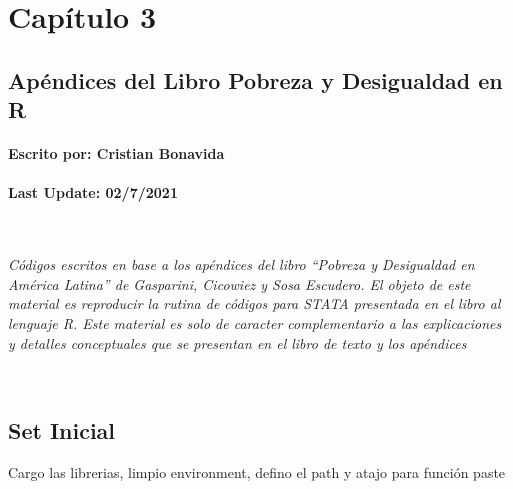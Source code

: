 \documentclass[
]{book}
\begin{document}
\hypertarget{capuxedtulo-3}{%
\chapter{Capítulo 3}\label{capuxedtulo-3}}

\hypertarget{apuxe9ndices-del-libro-pobreza-y-desigualdad-en-r-1}{%
\section*{Apéndices del Libro Pobreza y Desigualdad en R}\label{apuxe9ndices-del-libro-pobreza-y-desigualdad-en-r-1}}

\hypertarget{escrito-por-cristian-bonavida-1}{%
\subsubsection*{Escrito por: Cristian Bonavida}\label{escrito-por-cristian-bonavida-1}}

\hypertarget{last-update-0272021-1}{%
\subsubsection*{Last Update: 02/7/2021}\label{last-update-0272021-1}}

~

\emph{Códigos escritos en base a los apéndices del libro ``Pobreza y Desigualdad en América Latina'' de Gasparini, Cicowiez y Sosa Escudero. El objeto de este material es reproducir la rutina de códigos para STATA presentada en el libro al lenguaje R. Este material es solo de caracter complementario a las explicaciones y detalles conceptuales que se presentan en el libro de texto y los apéndices}

~

\hypertarget{set-inicial-1}{%
\section*{Set Inicial}\label{set-inicial-1}}

Cargo las librerias, limpio environment, defino el path y atajo para función paste
\end{document}
